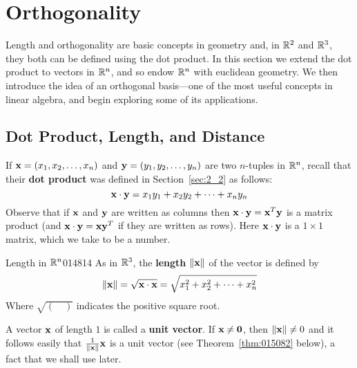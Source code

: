 \newpage
\section{Orthogonality}
\label{sec:5_3}

Length and orthogonality are basic concepts in geometry and, in $\mathbb{R}^2$ and $\mathbb{R}^3$, they both can be defined using the dot product. In this section we extend the dot product to vectors in $\mathbb{R}^n$, and so endow $\mathbb{R}^n$ with euclidean geometry. We then introduce the idea of an orthogonal basis---one of the most useful concepts in linear algebra, and begin exploring some of its applications.

\subsection*{Dot Product, Length, and Distance}

If $\textbf{x} = (x_{1}, x_{2}, \dots, x_{n})$ and $\textbf{y} =
(y_{1}, y_{2}, \dots, y_{n})$ are two $n$-tuples in $\mathbb{R}^n$, recall
that their \textbf{dot product} was defined in Section~\ref{sec:2_2} as follows:
\begin{equation*}
\textbf{x} \cdot \textbf{y} = x_1y_1 + x_2y_2 + \dots + x_ny_n
\end{equation*} 
Observe that if $\textbf{x}$ and $\textbf{y}$ are written as columns then
$\textbf{x} \cdot \textbf{y} = \textbf{x}^{T}\textbf{y}$ is a matrix
product (and $\textbf{x} \cdot \textbf{y} = \textbf{x}\textbf{y}^{T}$ if
they are written as rows). Here $\textbf{x} \cdot \textbf{y}$ is a $1
\times 1 $ matrix, which we take to be a number.

\begin{definition}{Length in $\mathbb{R}^n$}{014814} %
As in $\mathbb{R}^3$, the \textbf{length} $\|\textbf{x}\|$ of the vector is defined by
\begin{equation*}
\|\textbf{x}\| = \sqrt{\textbf{x}\cdot\textbf{x}} = \sqrt{x_1^2 + x_2^2 + \dots + x_n^2}
\end{equation*}
Where $\sqrt{(\quad )}$ indicates the positive square root.
\end{definition}

\noindent A vector $\textbf{x}$ of length $1$ is called a \textbf{unit vector}. If $\textbf{x} \neq \textbf{0}$, then $\|\textbf{x}\| \neq 0$ and it follows easily that 
$\tfrac{1}{\|\textbf{x}\|}\textbf{x}$ is a unit vector (see Theorem~\ref{thm:015082} below), a fact that we shall use later.

